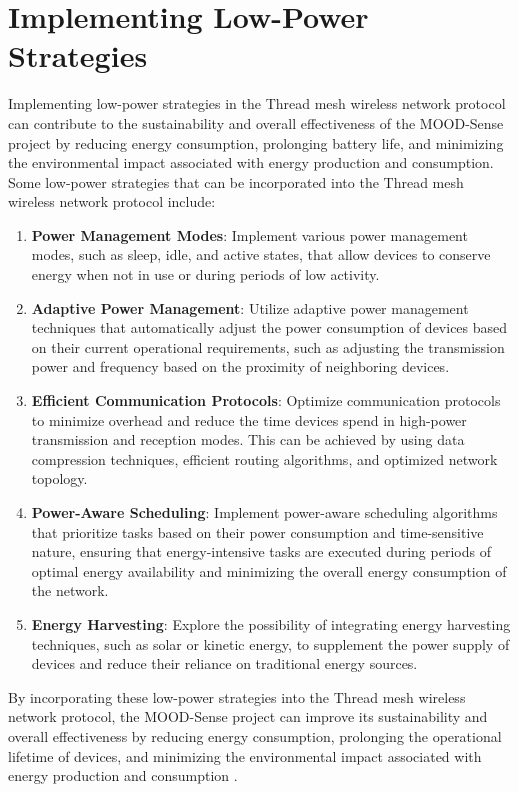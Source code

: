 \section{Implementing Low-Power Strategies}

Implementing low-power strategies in the Thread mesh wireless network protocol can contribute to the sustainability and overall effectiveness of the MOOD-Sense project by reducing energy consumption, prolonging battery life, and minimizing the environmental impact associated with energy production and consumption. Some low-power strategies that can be incorporated into the Thread mesh wireless network protocol include:

\begin{enumerate}
    \item \textbf{Power Management Modes}: Implement various power management modes, such as sleep, idle, and active states, that allow devices to conserve energy when not in use or during periods of low activity.
    \item \textbf{Adaptive Power Management}: Utilize adaptive power management techniques that automatically adjust the power consumption of devices based on their current operational requirements, such as adjusting the transmission power and frequency based on the proximity of neighboring devices.
    \item \textbf{Efficient Communication Protocols}: Optimize communication protocols to minimize overhead and reduce the time devices spend in high-power transmission and reception modes. This can be achieved by using data compression techniques, efficient routing algorithms, and optimized network topology.
    \item \textbf{Power-Aware Scheduling}: Implement power-aware scheduling algorithms that prioritize tasks based on their power consumption and time-sensitive nature, ensuring that energy-intensive tasks are executed during periods of optimal energy availability and minimizing the overall energy consumption of the network.
    \item \textbf{Energy Harvesting}: Explore the possibility of integrating energy harvesting techniques, such as solar or kinetic energy, to supplement the power supply of devices and reduce their reliance on traditional energy sources.
\end{enumerate}

By incorporating these low-power strategies into the Thread mesh wireless network protocol, the MOOD-Sense project can improve its sustainability and overall effectiveness by reducing energy consumption, prolonging the operational lifetime of devices, and minimizing the environmental impact associated with energy production and consumption \cite{Thread_Low_Power_2018}.



